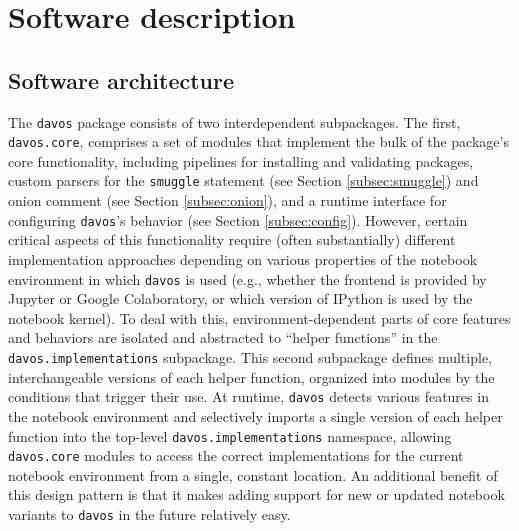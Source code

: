 \documentclass[preprint,12pt, a4paper]{elsarticle}
\newcommand{\comment}[1]{}
\begin{document}
\section{Software description}


\subsection{Software architecture}
The \texttt{davos} package consists of two interdependent subpackages. The first, \texttt{davos.core}, comprises a set of modules that implement\comment{provide?} the bulk of the package's core functionality, including pipelines for installing and validating packages, custom parsers for the \texttt{smuggle} statement (see Section \ref{subsec:smuggle}) and onion comment (see Section \ref{subsec:onion}), and a runtime interface for configuring \texttt{davos}'s behavior (see Section \ref{subsec:config}). However, certain critical\comment{other important} aspects of this functionality require (often substantially) different implementation approaches depending on various properties of the notebook environment in which \texttt{davos} is used (e.g., whether the frontend is provided by Jupyter or Google Colaboratory, or which version of IPython \cite{PereGran07} is used by the notebook kernel). To deal with this, environment-dependent parts of core features and behaviors are isolated and abstracted to ``helper functions'' in the \texttt{davos.implementations} subpackage. This second subpackage defines multiple, interchangeable versions of each helper function, organized into\comment{per-environment} modules by the conditions that trigger their use. At runtime, \texttt{davos} detects various features in the notebook environment and selectively imports a single version of each helper function into the top-level \texttt{davos.implementations} namespace, allowing \texttt{davos.core} modules to access the correct implementations for the current notebook environment from a single, constant location. An additional benefit of this design pattern is that it makes adding support for new or updated notebook variants to \texttt{davos} in the future relatively easy.

\comment{
- js_functions.py?
- how parser is registered and deregistered?
- stub files?
- test suite?
- packaged with new PEP \_\_\_ standard (pyproject.toml + setup.cfg; no setup.py)?
}
\end{document}
